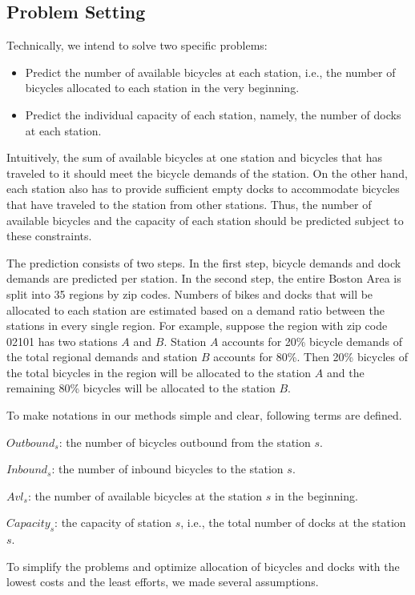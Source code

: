 \documentclass[journal, letterpaper]{IEEEtran}
\begin{document}
\subsection{Problem Setting}
Technically, we intend to solve two specific problems:
\begin{itemize}

\item Predict the number of available bicycles at each station, i.e., the number of bicycles allocated to each station in the very beginning.     
\item Predict  the individual capacity of each station, namely, the number of docks at each station.
\end{itemize} 
Intuitively, the sum of available bicycles at one station and bicycles that has traveled to it should meet the bicycle demands of the station. On the other hand, each station also has to provide sufficient empty docks to accommodate bicycles that have traveled to the station from other stations. Thus, the number of available bicycles and the capacity of each station should be predicted subject to these constraints. 

The prediction consists of two steps. In the first step, bicycle demands and dock demands are predicted per station. In the second step, the entire Boston Area is split into 35 regions by zip codes. Numbers of bikes and docks that will be allocated to each station are estimated based on a demand ratio between the stations in every single region. For example, suppose the region with zip code 02101 has two stations $A$ and $B$. Station $A$ accounts for 20\% bicycle demands of the total regional demands and station $B$ accounts for 80\%. Then 20\% bicycles of the total bicycles in the region will be allocated to the station $A$ and the remaining 80\% bicycles will be allocated to the station $B$.     

To make notations in our methods simple and clear, following terms are defined. 

$Outbound_{s}$: the number of bicycles outbound from the station $s$.

$Inbound_{s}$: the number of inbound bicycles to the station $s$. 

$Avl_{s}$: the number of available bicycles at the station $s$ in the beginning. 

$Capacity_{s}$: the capacity of station $s$, i.e., the total number of docks at the station $s$. 

To simplify the problems and optimize allocation of bicycles and docks with the lowest costs and the least efforts, we made several assumptions.
\end{document}
